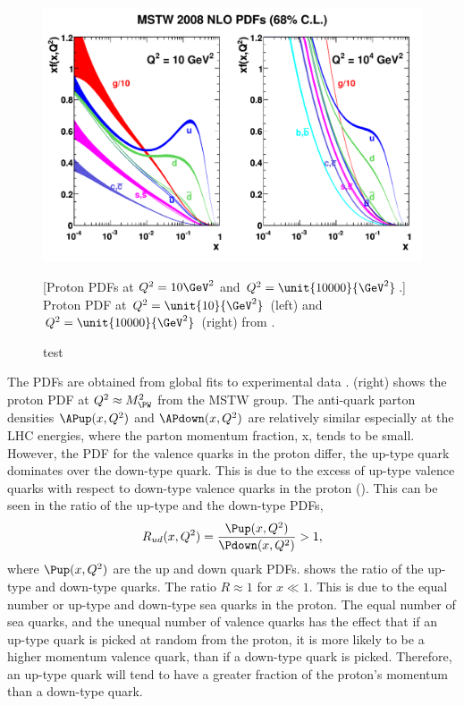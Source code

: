 \begin{figure}[htbp]
  \centering
  \includegraphics[width=\textwidth]{mstw2008nlo68cl_allpdfs}
  \caption{test}
[Proton PDFs at $Q^2 = {10}{\GeV^2}$ and $Q^2 = \unit{10000}{\GeV^2}$.]
{Proton PDF at $Q^2 = \unit{10}{\GeV^2}$ (left) 
and $Q^2 = \unit{10000}{\GeV^2}$ (right) from \cite{martin2009parton}.}
  \label{wbos:pdf}
\end{figure}

The {PDFs} are obtained from global fits to experimental data
\cite{martin2009parton}.   (right) shows the proton PDF at
$Q^2\approx M_{\PW}^2$ from the MSTW group.  The anti-quark parton densities
$\APup(x,Q^2)$ and $\APdown(x,Q^2)$ are relatively similar especially at the LHC
energies, where the parton momentum fraction, x, tends to be small.
However, the {PDF} for the valence quarks in the proton differ, 
the up-type quark dominates over the down-type quark.
This is due to the excess of up-type valence quarks with respect to down-type
valence quarks in the proton (\HepProcess{\Pup\Pup\Pdown}). 
This can be seen in the ratio of the up-type and the down-type {PDFs},
\begin{equation}
  R_{ud}(x,Q^2) = \frac{\Pup(x,Q^2)}{\Pdown(x,Q^2)} > 1,
\end{equation}
where $\Pup(x,Q^2)$ are the up and down quark {PDFs}.
 shows the ratio of the up-type and down-type quarks.
The ratio $R \approx 1$ for $x \ll 1$. This is due to the equal number or
up-type and down-type sea quarks in the proton. The equal number of sea quarks,
and the unequal number of valence quarks has the effect that if an up-type quark
is picked at random from the proton, it is more likely to be a higher momentum
valence quark, than if a down-type quark is picked.  Therefore, an up-type quark
will tend to have a greater fraction of the proton's momentum than a down-type
quark.

